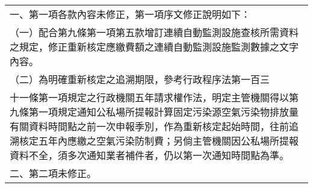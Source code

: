 \begin{tabular}{p{\linewidth}}一、第一項各款內容未修正，第一項序文修正說明如下：\\（一）配合第九條第一項第五款增訂連續自動監測設施查核所需資料之規定，修正重新核定應繳費額之連續自動監測設施監測數據之文字內容。\\（二）為明確重新核定之追溯期限，參考行政程序法第一百三\\十一條第一項規定之行政機關五年請求權作法，明定主管機關得以第九條第一項規定通知公私場所提報計算固定污染源空氣污染物排放量有關資料時間點之前一次申報季別，作為重新核定起始時間，往前追溯核定五年內應繳之空氣污染防制費；另倘主管機關因公私場所提報資料不全，須多次通知業者補件者，仍以第一次通知時間點為準。\\二、第二項未修正。\end{tabular}  \\

